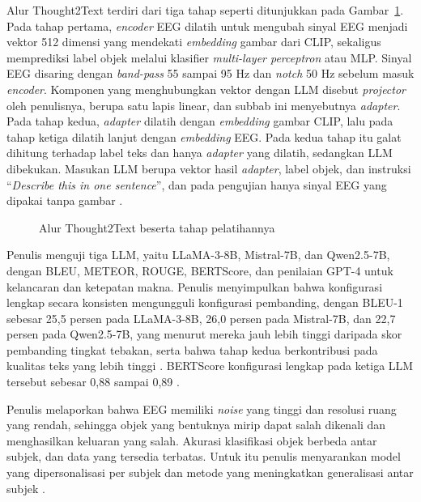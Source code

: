 Alur Thought2Text terdiri dari tiga tahap seperti ditunjukkan pada Gambar~\ref{fig:thought2text}.
Pada tahap pertama, \textit{encoder} EEG dilatih untuk mengubah sinyal EEG menjadi vektor 512 dimensi yang mendekati \textit{embedding} gambar dari CLIP, sekaligus memprediksi label objek melalui klasifier \textit{multi-layer perceptron} atau MLP.
Sinyal EEG disaring dengan \textit{band-pass} 55 sampai 95 Hz dan \textit{notch} 50 Hz sebelum masuk \textit{encoder}.
Komponen yang menghubungkan vektor dengan LLM disebut \textit{projector} oleh penulisnya, berupa satu lapis linear, dan subbab ini menyebutnya \textit{adapter}.
Pada tahap kedua, \textit{adapter} dilatih dengan \textit{embedding} gambar CLIP, lalu pada tahap ketiga dilatih lanjut dengan \textit{embedding} EEG.
Pada kedua tahap itu galat dihitung terhadap label teks dan hanya \textit{adapter} yang dilatih, sedangkan LLM dibekukan.
Masukan LLM berupa vektor hasil \textit{adapter}, label objek, dan instruksi ``\textit{Describe this in one sentence}'', dan pada pengujian hanya sinyal EEG yang dipakai tanpa gambar \parencite{mishra2025}.

\begin{figure}[H]
  \centering
  
  \caption{Alur Thought2Text beserta tahap pelatihannya \parencite[digambar ulang dari][]{mishra2025}}
  \label{fig:thought2text}
\end{figure}

Penulis menguji tiga LLM, yaitu LLaMA-3-8B, Mistral-7B, dan Qwen2.5-7B, dengan BLEU, METEOR, ROUGE, BERTScore, dan penilaian GPT-4 untuk kelancaran dan ketepatan makna.
Penulis menyimpulkan bahwa konfigurasi lengkap secara konsisten mengungguli konfigurasi pembanding, dengan BLEU-1 sebesar 25,5 persen pada LLaMA-3-8B, 26,0 persen pada Mistral-7B, dan 22,7 persen pada Qwen2.5-7B, yang menurut mereka jauh lebih tinggi daripada skor pembanding tingkat tebakan, serta bahwa tahap kedua berkontribusi pada kualitas teks yang lebih tinggi \parencite{mishra2025}.
BERTScore konfigurasi lengkap pada ketiga LLM tersebut sebesar 0,88 sampai 0,89 \parencite{mishra2025}.

Penulis melaporkan bahwa EEG memiliki \textit{noise} yang tinggi dan resolusi ruang yang rendah, sehingga objek yang bentuknya mirip dapat salah dikenali dan menghasilkan keluaran yang salah.
Akurasi klasifikasi objek berbeda antar subjek, dan data yang tersedia terbatas.
Untuk itu penulis menyarankan model yang dipersonalisasi per subjek dan metode yang meningkatkan generalisasi antar subjek \parencite{mishra2025}.

